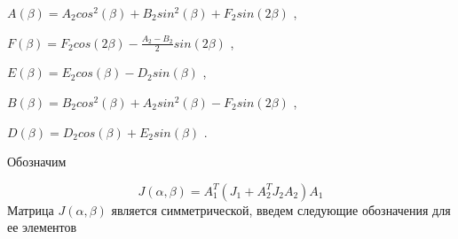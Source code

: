 \( A \left(  \beta  \right) =A_{2}cos^{2} \left(  \beta  \right) +B_{2}sin^{2} \left(  \beta  \right) +F_{2}sin \left( 2 \beta  \right)  \) ,\par

\( F \left(  \beta  \right) =F_{2}cos \left( 2 \beta  \right) -\frac{A_{2}-B_{2}}{2}sin \left( 2 \beta  \right)  \) ,\par

\( E \left(  \beta  \right) =E_{2}cos \left(  \beta  \right) -D_{2}sin \left(  \beta  \right)  \) ,\par

\( B \left(  \beta  \right) =B_{2}cos^{2} \left(  \beta  \right) +A_{2}sin^{2} \left(  \beta  \right) -F_{2}sin \left( 2 \beta  \right)  \) ,\par

\( D \left(  \beta  \right) =D_{2}cos \left(  \beta  \right) +E_{2}sin \left(  \beta  \right)  \) .\par

Обозначим\par


\begin{equation} %
\label{eq:p3:23}
J \left(  \alpha , \beta  \right) =A_{1}^{T} \left( J_{1}+A_{2}^{T}J_{2}A_{2} \right) A_{1}
\end{equation}
Матрица  \( J \left(  \alpha , \beta  \right)  \)  является симметрической, введем следующие обозначения для ее элементов\par


